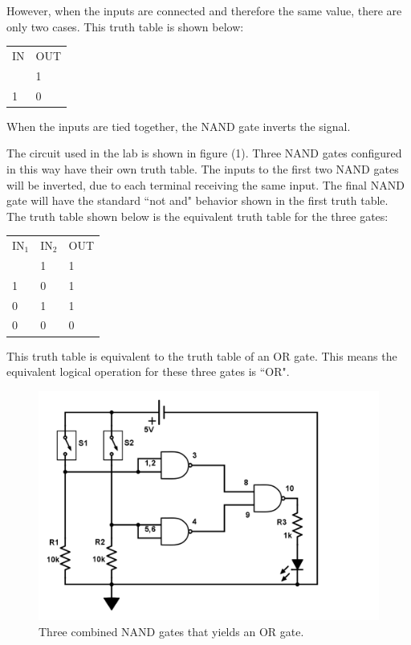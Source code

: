 \documentclass[twocolumn, amsmath]{revtex4}
\begin{document}
However, when the inputs are connected and therefore the same value, there are only two cases. This truth table is shown below:

\begin{center}
	\begin{ruledtabular}
    \begin{tabular}{ l l}
	IN & OUT\\ \colrule
	0 & 1 \\
	1 & 0 \\
\end{tabular}
    \end{ruledtabular}
\end{center}

When the inputs are tied together, the NAND gate inverts the signal. 

The circuit used in the lab is shown in figure (1). Three NAND gates configured in this way have their own truth table. The inputs to the first two NAND gates will be inverted, due to each terminal receiving the same input. The final NAND gate will have the standard ``not and" behavior shown in the first truth table. The truth table shown below is the equivalent truth table for the three gates:

\begin{center}
	\begin{ruledtabular}
    \begin{tabular}{ l l l}
	IN$_1$ & IN$_2$ & OUT\\ \colrule
	1 & 1 & 1 \\
	1 & 0 & 1 \\
	0 & 1 & 1 \\
	0 & 0 & 0  \\
\end{tabular}
    \end{ruledtabular}
\end{center}

This truth table is equivalent to the truth table of an OR gate. This means the equivalent logical operation for these three gates is ``OR".


\begin{figure}[h]
    \includegraphics[scale=0.25]{NAND.png}  
    \caption{Three combined NAND gates that yields an OR gate.}
\end{figure}
\end{document}
